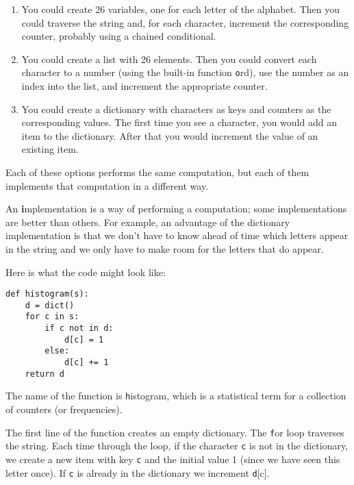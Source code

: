 \documentclass[
DIV=11,
fontsize=13,
twoside,
headinclude=false,
titlepage=firstiscover,
abstract=true,
headsepline=true,
footsepline=true,
chapterprefix=true, %
headings=big,
bibliography=totoc,%
captions=tableheading
]{scrbook}
\theoremstyle{definition}
\begin{document}
\begin{enumerate}

\item You could create 26 variables, one for each letter of the
alphabet.  Then you could traverse the string and, for each
character, increment the corresponding counter, probably using
a chained conditional.

\item You could create a list with 26 elements.  Then you could
convert each character to a number (using the built-in function
{\texttt ord}), use the number as an index into the list, and increment
the appropriate counter.

\item You could create a dictionary with characters as keys
and counters as the corresponding values.  The first time you
see a character, you would add an item to the dictionary.  After
that you would increment the value of an existing item.

\end{enumerate}

Each of these options performs the same computation, but each
of them implements that computation in a different way.

An {\textbf implementation} is a way of performing a computation;
some implementations are better than others.  For example,
an advantage of the dictionary implementation is that we don't
have to know ahead of time which letters appear in the string
and we only have to make room for the letters that do appear.

Here is what the code might look like:

\begin{lstlisting}
def histogram(s):
    d = dict()
    for c in s:
        if c not in d:
            d[c] = 1
        else:
            d[c] += 1
    return d
\end{lstlisting}
%
The name of the function is {\texttt histogram}, which is a statistical
term for a collection of counters (or frequencies).

The first line of the
function creates an empty dictionary.  The {\texttt for} loop traverses
the string.  Each time through the loop, if the character {\texttt c} is
not in the dictionary, we create a new item with key {\texttt c} and the
initial value 1 (since we have seen this letter once).  If {\texttt c} is
already in the dictionary we increment {\texttt d[c]}.
\end{document}

